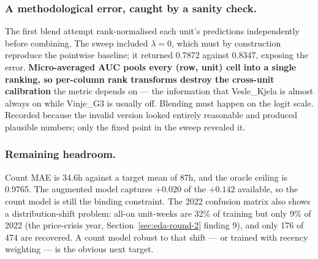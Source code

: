 

\subsubsection*{A methodological error, caught by a sanity check.}
The first blend attempt rank-normalised each unit's predictions independently before combining.
The sweep included $\lambda{=}0$, which must by construction reproduce the pointwise baseline; it
returned 0.7872 against 0.8347, exposing the error. \textbf{Micro-averaged AUC pools every
(row, unit) cell into a single ranking, so per-column rank transforms destroy the cross-unit
calibration} the metric depends on --- the information that Vesle\_Kjela is almost always on while
Vinje\_G3 is usually off. Blending must happen on the logit scale. Recorded because the invalid
version looked entirely reasonable and produced plausible numbers; only the fixed point in the
sweep revealed it.

\subsubsection*{Remaining headroom.}
Count MAE is 34.6h against a target mean of 87h, and the oracle ceiling is 0.9765. The augmented
model captures $+0.020$ of the $+0.142$ available, so the count model is still the binding
constraint. The 2022 confusion matrix also shows a distribution-shift problem: all-on unit-weeks
are 32\% of training but only 9\% of 2022 (the price-crisis year, Section~\ref{sec:eda-round-2}
finding 9), and only 176 of 474 are recovered. A count model robust to that shift --- or trained
with recency weighting --- is the obvious next target.
